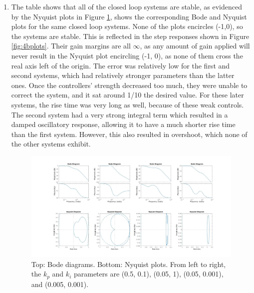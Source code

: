 \documentclass[11pt]{article}
\theoremstyle{definition}
\begin{document}
\begin{enumerate}
\begin{enumerate}
        \item %

        The table shows that all of the closed loop systems are stable, as evidenced by the Nyquist plots in Figure \ref{fig:4b_bodenyquist}, shows the corresponding Bode and Nyquist plots for the same closed loop systems.  None of the plots encircles (-1,0), so the systems are stable.  This is reflected in the step responses shown in Figure \ref{fig:4bplots}.  Their gain margins are all $\infty$, as any amount of gain applied will never result in the Nyquist plot encircling (-1, 0), as none of them cross the real axis left of the origin.  The error was relatively low for the first and second systems, which had relatively stronger parameters than the latter ones.  Once the controllers' strength decreased too much, they were unable to correct the system, and it sat around 1/10 the desired value.  For these later systems, the rise time was very long as well, because of these weak controls.  The second system had a very strong integral term which resulted in a damped oscillatory response, allowing it to have a much shorter rise time than the first system.  However, this also resulted in overshoot, which none of the other systems exhibit.

        \begin{figure}[H]
            \centering
            \includegraphics[width = \textwidth]{ES155P7_4b_bodenyquist.jpg}
            \caption{Top: Bode diagrams.  Bottom: Nyquist plots.  From left to right, the $k_p$ and $k_i$ parameters are (0.5, 0.1), (0.05, 1), (0.05, 0.001), and (0.005, 0.001).}
            \label{fig:4b_bodenyquist}
        \end{figure}

    \end{enumerate}

\end{enumerate}
\end{document}
